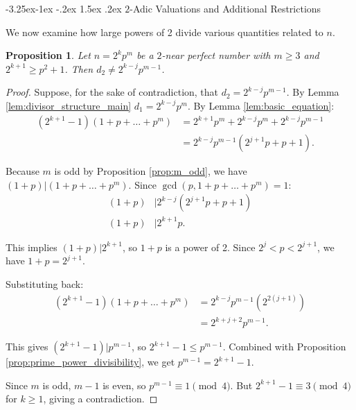 \documentclass[10pt]{article}
\makeatletter
\renewcommand\subsection{\@startsection{subsection}{2}{\z@}
{-3.25ex\@plus -1ex \@minus -.2ex}
{1.5ex \@plus .2ex}
{\normalfont\normalsize\bfseries\boldmath}}
\newtheorem{proposition}{Proposition}
\theoremstyle{definition}
\makeatother
\begin{document}
\subsection{$2$-Adic Valuations and Additional Restrictions}
\label{sec:2-adic-valuation}

We now examine how large powers of 2 divide various quantities related to $n$.

\begin{proposition}\label{prop:edge_case}
Let $n=2^kp^m$ be a $2$-near perfect number with $m\geq 3$ and $2^{k+1}\geq p^2+1$. Then $d_2 \neq 2^{k-j}p^{m-1}$.
\end{proposition}

\begin{proof}
Suppose, for the sake of contradiction, that $d_2 = 2^{k-j}p^{m-1}$. By Lemma \ref{lem:divisor_structure_main} $d_1 = 2^{k-j}p^m$. By Lemma \ref{lem:basic_equation}: %
\begin{align*}
    (2^{k+1}-1)(1+p+\ldots+p^m) &= 2^{k+1}p^m + 2^{k-j}p^m + 2^{k-j}p^{m-1}\\
    &= 2^{k-j}p^{m-1}(2^{j+1}p + p + 1).
\end{align*}

Because $m$ is odd by Proposition \ref{prop:m_odd}, we have $(1+p) | (1+p+\ldots+p^m)$. Since $\gcd(p, 1+p+\ldots+p^m) = 1$:
\begin{align*}
    (1+p) &| 2^{k-j}(2^{j+1}p + p + 1)\\
    (1+p) &| 2^{k+1}p.
\end{align*}

This implies $(1+p) | 2^{k+1}$, so $1+p$ is a power of 2. Since $2^j < p < 2^{j+1}$, we have $1+p = 2^{j+1}$.

Substituting back:
\begin{align*}
    (2^{k+1}-1)(1+p+\ldots+p^m) &= 2^{k-j}p^{m-1}(2^{2(j+1)})\\
    &= 2^{k+j+2}p^{m-1}.
\end{align*}

This gives $(2^{k+1}-1) | p^{m-1}$, so $2^{k+1}-1 \leq p^{m-1}$. Combined with Proposition \ref{prop:prime_power_divisibility}, we get $p^{m-1} = 2^{k+1}-1$.

Since $m$ is odd, $m-1$ is even, so $p^{m-1} \equiv 1 \pmod{4}$. But $2^{k+1}-1 \equiv 3 \pmod{4}$ for $k \geq 1$, giving a contradiction. %
\end{proof}
\end{document}
